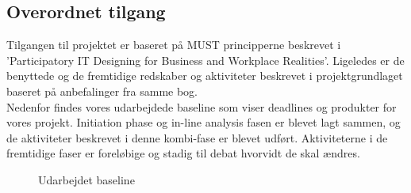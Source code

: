 \subsection{Overordnet tilgang}
Tilgangen til projektet er baseret på MUST principperne beskrevet i 'Participatory IT Designing for Business and Workplace Realities'. Ligeledes er de benyttede og de fremtidige redskaber og aktiviteter beskrevet i projektgrundlaget baseret på anbefalinger fra samme bog.\\
Nedenfor findes vores udarbejdede baseline som viser deadlines og produkter for vores projekt. Initiation phase og in-line analysis fasen er blevet lagt sammen, og de aktiviteter beskrevet i denne kombi-fase er blevet udført. Aktiviteterne i de fremtidige faser er foreløbige og stadig til debat hvorvidt de skal ændres. 
\begin{figure}[h!]
	\caption{Udarbejdet baseline}
\end{figure}